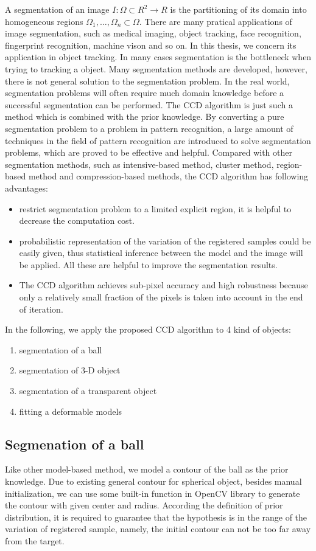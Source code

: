 A segmentation of an image $I: \Omega \subset R^2 \longrightarrow R$
is the partitioning of its domain into homogeneous regions
$\Omega_1,\ldots, \Omega_n \subset \Omega$. There are many pratical
applications of image segmentation, such as medical imaging, object
tracking, face recognition, fingerprint recognition, machine vison and
so on. In this thesis, we concern its application in object tracking.
In many cases segmentation is the bottleneck when trying to tracking a
object. Many segmentation methods are developed, however, there is not
general solution to the segmentation problem. In the real world,
segmentation problems will often require much domain knowledge before
a successful segmentation can be performed. The CCD algorithm is just
such a method which is combined with the prior knowledge. By
converting a pure segmentation problem to a problem in pattern
recognition, a large amount of techniques in the field of pattern
recognition are introduced to solve segmentation problems, which are
proved to be effective and helpful. Compared with other segmentation
methods, such as intensive-based method,  cluster method, region-based
method and compression-based methods, the CCD algorithm has following
advantages:
\begin{itemize}
\item restrict segmentation problem to a limited explicit region, it is helpful
  to decrease the computation cost.
\item probabilistic representation of the variation of the registered
  samples could be easily given, thus statistical inference between
  the model and the image will be applied. All these are helpful to
  improve the segmentation results.
\item The CCD algorithm achieves sub-pixel accuracy and high
  robustness because only a relatively small fraction of the pixels is
  taken into account in the end of iteration.
\end{itemize}

In the following, we apply the proposed CCD algorithm to 4 kind of
objects:
\begin{enumerate}
\item segmentation of a ball
\item segmentation of 3-D object
\item segmentation of a transparent object
\item fitting a deformable models
\end{enumerate}

\subsection{Segmenation of a ball}
\label{sec:sb}
Like other model-based method, we model a contour of the ball as the
prior knowledge. Due to existing general contour for spherical object,
besides manual initialization, we can use some built-in function in
OpenCV library to generate the contour with given center and
radius. According the definition of prior distribution, it is required
to guarantee that the hypothesis is in the range of the variation of
registered sample, namely, the initial contour can not be too far away
from the target.

